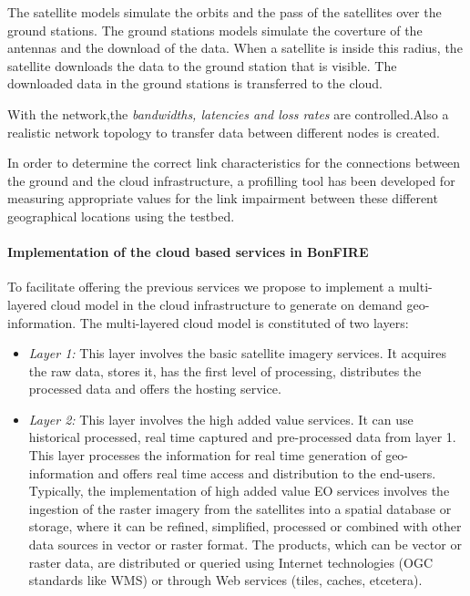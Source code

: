 \begin{enumerate}
The satellite models simulate the orbits and the pass of the satellites over the ground stations. The ground stations models simulate the coverture of the antennas and the download of the data. When a satellite is inside this radius, the satellite downloads the data to the ground station that is visible. The downloaded data in the ground stations is transferred to the \bonfire cloud. 

With the \vw network,the \emph{bandwidths, latencies and loss rates} are
controlled.Also a realistic network topology to transfer data between different
nodes is created. 

In order to determine the correct link characteristics for the connections
between the ground and the cloud infrastructure, a profilling tool has been
developed for measuring appropriate values for the link impairment between these different geographical locations using the \pl testbed. 


\paragraph{Implementation of the cloud based services in BonFIRE}
 
To facilitate offering the previous services we propose to implement a multi-layered cloud model in the \bonfire cloud infrastructure to generate on demand geo-information. The multi-layered cloud model is constituted of two layers:
\begin{itemize}
\item \emph{Layer 1:} This layer involves the basic satellite imagery services.  It acquires the raw data, stores it, has the first level of processing, distributes the processed data and offers the hosting service. 

\item \emph{Layer 2:} This layer involves the high added value services. It can use historical processed, real time captured and pre-processed data from layer 1. This layer processes the information for real time generation of geo-information and offers real time access and distribution to the end-users. Typically, the implementation of high added value EO services involves the ingestion of the raster imagery from the satellites into a spatial database or storage, where it can be refined, simplified, processed or combined with other data sources in vector or raster format. The products, which can be vector or raster data, are distributed or queried using Internet technologies (OGC standards like WMS) or through Web services (tiles, caches, etcetera). 
\end{itemize}


\end{enumerate}
